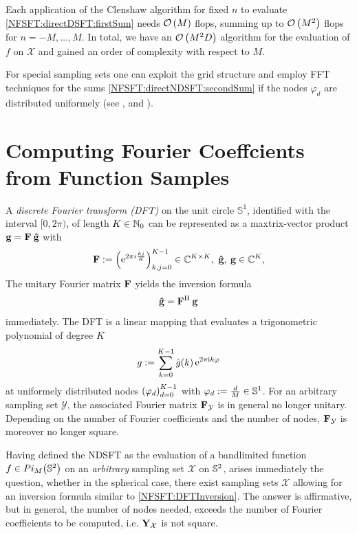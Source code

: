 Each application of the Clenshaw algorithm for fixed $n$ to evaluate \eqref{NFSFT:directDSFT:firstSum} needs $\mathcal{O}\left(M\right)$ 
flops, summing up to $\mathcal{O}\left(M^2\right)$ flops for $n = -M,\ldots,M$. In 
total, we have an $\mathcal{O}\left(M^2 D\right)$ algorithm for the evaluation of $f$ on $\mathcal{X}$ and gained an order of complexity with respect to $M$. 

For special sampling sets one can exploit the grid 
structure and employ FFT techniques for the sums \eqref{NFSFT:directNDSFT:secondSum} if the nodes $\varphi_{d}$ are distributed uniformely 
(see \cite{drhe}, \cite{postta97} and \cite{kupo02}). 


\section{Computing Fourier Coeffcients from Function Samples}
\label{NFSFT:iDSFT}
A \emph{discrete Fourier transform (DFT)} on the unit circle $\mathbb{S}^1$, identified with the interval $[0,2\pi)$, 
of length $K \in \mathbb{N}_{0}$ can be represented as a maxtrix-vector product
$\mathbf{g} = \mathbf{F} \: \mathbf{\hat{g}}$ with
\[
 \mathbf{F} := \left(\mbox{\rm{e}}^{2 \pi i \frac{kj}{K}}\right)_{k,j = 0}^{K-1} \in 
 \mathbb{C}^{K \times K},\ \mathbf{\hat{g}},\:\mathbf{g} \in \mathbb{C}^{K},
\]
The unitary Fourier matrix $\mathbf{F}$ yields the inversion formula
\begin{equation}
  \label{NFSFT:DFTInversion}
  \mathbf{\hat{g}} = \mathbf{F}^{\text{\rm{H}}} \: \mathbf{g}
\end{equation}
immediately. The DFT is a linear mapping that evaluates a 
trigonometric polynomial of degree $K$
\[
  g := \sum_{k=0}^{K-1} \hat{g}{\hspace{-0.4ex}}\left(k\right) \mbox{\rm{e}}^{2 \pi \mbox{\scriptsize\rm{i}} k \varphi}
\]
at uniformely distributed nodes $\left(\varphi_{d}\right)_{d=0}^{K-1}$ with $\varphi_{d} := \frac{d}{M} \in \mathbb{S}^1$. 
For an arbitrary sampling set $\mathcal{Y}$, the associated Fourier matrix 
$\mathbf{F}_{\mathcal{Y}}$ is in general no longer unitary. 
Depending on the number of Fourier coefficients and the number of nodes,
$\mathbf{F}_{\mathcal{Y}}$ is moreover no longer square.

Having defined the NDSFT as the evaluation of a bandlimited function $f \in 
Pi_{M}{\hspace{-0.4ex}}\left(\mathbb{S}^2\right)$ on an \emph{arbitrary} 
sampling set $\mathcal{X}$ on $\mathbb{S}^2$, arises immediately the question, 
whether in the spherical case, there exist sampling sets $\mathcal{X}$ allowing for an inversion formula similar to \eqref{NFSFT:DFTInversion}.
The answer is affirmative, but in general, the number of nodes needed, exceeds the number of Fourier coefficients to be computed, 
i.e. $\mathbf{Y}_{\mathcal{X}}$ is not square.


